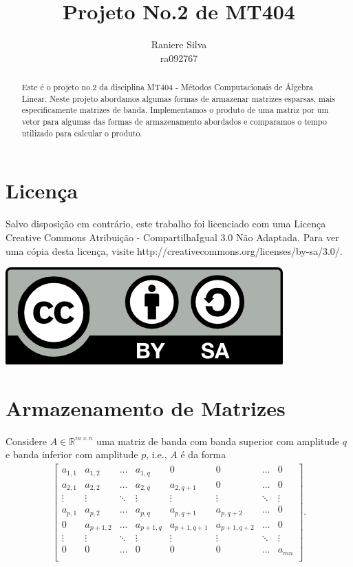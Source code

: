 \documentclass[12pt,a4paper]{article}
\begin{document}
\title{Projeto No.2 de MT404}
\author{Raniere Silva \\ ra092767}
\maketitle
\begin{abstract}
    Este \'{e} o projeto no.2 da disciplina MT404 - M\'{e}todos Computacionais de \'{A}lgebra Linear. Neste projeto abordamos algumas formas de armazenar matrizes esparsas, mais especificamente matrizes de banda. Implementamos o produto de uma matriz por um vetor para algumas das formas de armazenamento abordados e comparamos o tempo utilizado para calcular o produto.
\end{abstract}
\tableofcontents
\lstlistoflistings
\section*{Licen\c{c}a}
Salvo disposi\c{c}\~{a}o em contr\'{a}rio, este trabalho foi licenciado com uma Licen\c{c}a Creative Commons Atribui\c{c}\~{a}o - CompartilhaIgual 3.0 N\~{a}o Adaptada. Para ver uma c\'{o}pia desta licen\c{c}a, visite http://creativecommons.org/licenses/by-sa/3.0/.
\begin{center}
    \includegraphics{../figuras/cc-by-sa.png}
\end{center}
\newpage
\section{Armazenamento de Matrizes}
Considere $A \in \mathbb{R}^{m \times n}$ uma matriz de banda com banda superior com amplitude $q$ e banda inferior com amplitude $p$, i.e., $A$ \'{e} da forma
\begin{align*}
    \begin{bmatrix}
        a_{1,1} & a_{1,2} & \ldots & a_{1,q} & 0 & 0 & \ldots & 0 \\
        a_{2,1} & a_{2,2} & \ldots & a_{2,q} & a_{2,q+1} & 0 & \ldots & 0 \\
        \vdots & \vdots & \ddots & \vdots & \vdots & \vdots & \ddots & \vdots \\
        a_{p,1} & a_{p,2} & \ldots & a_{p,q} & a_{p,q+1} & a_{p,q+2} & \ldots & 0 \\
        0 & a_{p+1,2} & \ldots & a_{p+1,q} & a_{p+1,q+1} & a_{p+1,q+2} & \ldots & 0 \\
        \vdots & \vdots & \ddots & \vdots & \vdots & \vdots & \ddots & \vdots \\
        0 & 0 & \ldots & 0 & 0 & 0 & \ldots & a_{mn} \\
    \end{bmatrix}.
\end{align*}
\end{document}
